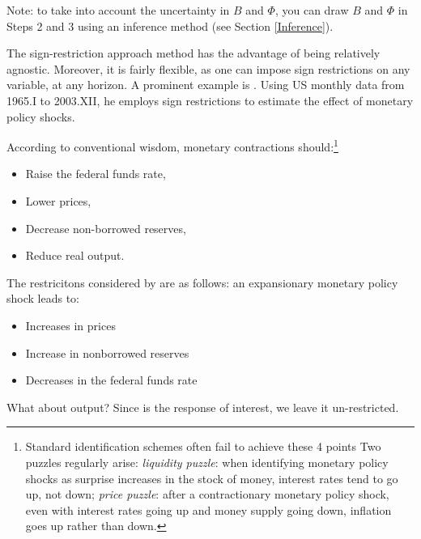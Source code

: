 \documentclass[
  12pt,
]{book}
\providecommand{\tightlist}{%
  \setlength{\itemsep}{0pt}\setlength{\parskip}{0pt}}
\theoremstyle{definition}
\theoremstyle{definition}
\theoremstyle{definition}
\theoremstyle{definition}
\theoremstyle{remark}
\begin{document}
Note: to take into account the uncertainty in \(B\) and \(\Phi\), you can draw \(B\) and \(\Phi\) in Steps 2 and 3 using an inference method (see Section \ref{Inference}).

The sign-restriction approach method has the advantage of being relatively agnostic. Moreover, it is fairly flexible, as one can impose sign restrictions on any variable, at any horizon. A prominent example is \citet{Uhlig_2005}. Using US monthly data from 1965.I to 2003.XII, he employs sign restrictions to estimate the effect of monetary policy shocks.

According to conventional wisdom, monetary contractions should:\footnote{Standard identification schemes often fail to achieve these 4 points Two puzzles regularly arise: \emph{liquidity puzzle}: when identifying monetary policy shocks as surprise increases in the stock of money, interest rates tend to go up, not down; \emph{price puzzle}: after a contractionary monetary policy shock, even with interest rates going up and money supply going down, inflation goes up rather than down.}

\begin{itemize}
\tightlist
\item
  Raise the federal funds rate,
\item
  Lower prices,
\item
  Decrease non-borrowed reserves,
\item
  Reduce real output.
\end{itemize}

The restricitons considered by \citet{Uhlig_2005} are as follows: an expansionary monetary policy shock leads to:

\begin{itemize}
\tightlist
\item
  Increases in prices
\item
  Increase in nonborrowed reserves
\item
  Decreases in the federal funds rate
\end{itemize}

What about output? Since is the response of interest, we leave it un-restricted.
\end{document}
